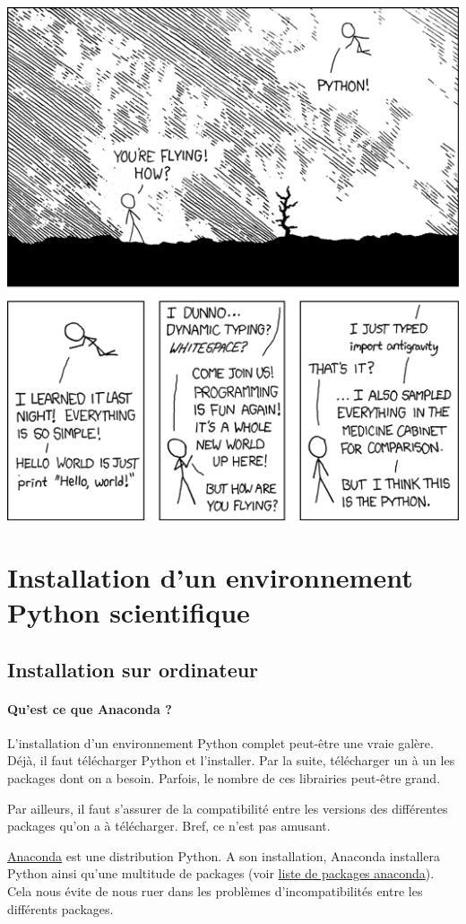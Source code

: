 \documentclass[%
oneside,                 %
final,                   %
10pt]{article}
\begin{document}
\noindent


\vspace{6mm}

\centerline{\includegraphics[width=0.6\linewidth]{figs/python_easy.png}}

\vspace{6mm}




\section{Installation d'un environnement Python scientifique}

\subsection{Installation sur ordinateur}

\paragraph{Qu’est ce que Anaconda ?}
L’installation d’un environnement Python complet peut-être une vraie galère. Déjà, il faut télécharger Python et l’installer. Par la suite, télécharger un à un les packages dont on a besoin. Parfois, le nombre de ces librairies peut-être grand.

Par ailleurs, il faut s’assurer de la compatibilité entre les versions des différentes packages qu’on a à télécharger. Bref, ce n’est pas amusant.

\href{{https://www.anaconda.com/download/}}{Anaconda} est  une distribution Python. A son installation, Anaconda installera Python ainsi qu'une multitude de packages (voir \href{{https://docs.anaconda.com/anaconda/packages/pkg-docs#python-3-6}}{liste de packages anaconda}).  Cela nous évite de nous ruer dans les problèmes d’incompatibilités entre les différents packages.
\end{document}
